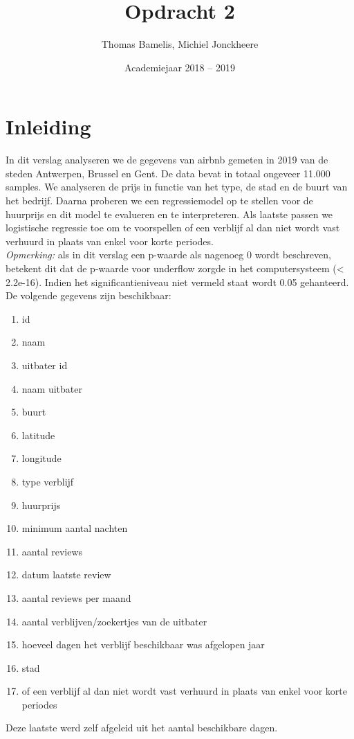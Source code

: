 \documentclass[a4paper,kulak]{kulakarticle} %
\date{Academiejaar 2018 -- 2019}
\title{Opdracht 2}
\author{Thomas Bamelis, Michiel Jonckheere}
\begin{document}
\maketitle

\section*{Inleiding}
In dit verslag analyseren we de gegevens van airbnb gemeten in 2019 van de steden Antwerpen, Brussel en Gent. 
De data bevat in totaal ongeveer 11.000 samples.
We analyseren de prijs in functie van het type, de stad en de buurt van het bedrijf.
Daarna proberen we een regressiemodel op te stellen voor de huurprijs en dit model te evalueren en te interpreteren.
Als laatste passen we logistische regressie toe om te voorspellen of een verblijf al dan niet wordt vast verhuurd in plaats van enkel voor korte periodes.\\
\textit{Opmerking:} als in dit verslag een p-waarde als nagenoeg 0 wordt beschreven, betekent dit dat de p-waarde voor underflow zorgde in het computersysteem (< 2.2e-16).
Indien het significantieniveau niet vermeld staat wordt 0.05 gehanteerd. \\
De volgende gegevens zijn beschikbaar:
\begin{enumerate}
	\item id                            
	\item naam                          
	\item uitbater id                     
	\item naam uitbater                    
	\item buurt                 
	\item latitude                      
	\item longitude                     
	\item type verblijf                     
	\item huurprijs                         
	\item minimum aantal nachten                
	\item aantal reviews             
	\item datum laatste review                   
	\item aantal reviews per maand             
	\item aantal verblijven/zoekertjes van de uitbater
	\item hoeveel dagen het verblijf beschikbaar was afgelopen jaar              
	\item stad                          
	\item of een verblijf al dan niet wordt vast verhuurd in plaats van enkel voor korte periodes                        
\end{enumerate}
Deze laatste werd zelf afgeleid uit het aantal beschikbare dagen.
\end{document}
